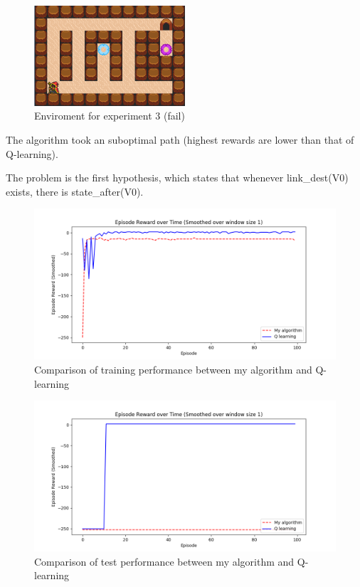 \begin{figure}[!htb]
\centering
\includegraphics[width=0.5\textwidth]{./figures/experiment3_v3}
\caption{Enviroment for experiment 3 (fail)}
\label{experiment3}
\end{figure}

The algorithm took an suboptimal path (highest rewards are lower than that of Q-learning).

The problem is the first hypothesis, which states that whenever link\_dest(V0) exists, there is state\_after(V0).

\begin{figure}[!htb]
\centering
\includegraphics[width=1.0\textwidth]{./figures/experiment3_training_fail}
\caption{Comparison of training performance between my algorithm and Q-learning}
\label{experiment3_training}
\end{figure}

\begin{figure}[!htb]
\centering
\includegraphics[width=1.0\textwidth]{./figures/experiment3_test_fail}
\caption{Comparison of test performance between my algorithm and Q-learning}
\label{experiment3_test}
\end{figure}

